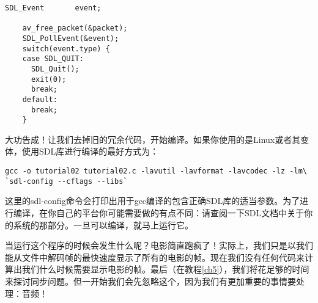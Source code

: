 \begin{lstlisting}
SDL_Event       event;

    av_free_packet(&packet);
    SDL_PollEvent(&event);
    switch(event.type) {
    case SDL_QUIT:
      SDL_Quit();
      exit(0);
      break;
    default:
      break;
    }
\end{lstlisting}

大功告成！让我们去掉旧的冗余代码，开始编译。如果你使用的是Linux或者其变体，使用SDL库进行编译的最好方式为：
\begin{lstlisting}
gcc -o tutorial02 tutorial02.c -lavutil -lavformat -lavcodec -lz -lm\
`sdl-config --cflags --libs`
\end{lstlisting}


这里的sdl-config命令会打印出用于gcc编译的包含正确SDL库的适当参数。为了进行编译，在你自己的平台你可能需要做的有点不同：请查阅一下SDL文档中关于你的系统的那部分。一旦可以编译，就马上运行它。

当运行这个程序的时候会发生什么呢？电影简直跑疯了！实际上，我们只是以我们能从文件中解码帧的最快速度显示了所有的电影的帧。现在我们没有任何代码来计算出我们什么时候需要显示电影的帧。最后（在教程\ref{ch5}），我们将花足够的时间来探讨同步问题。但一开始我们会先忽略这个，因为我们有更加重要的事情要处理：音频！
